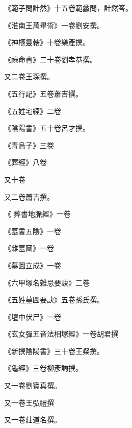 \begin{pinyinscope}
 《範子問計然》十五卷範蠡問，計然答。



 《淮南王萬畢術》一卷劉安撰。



 《神樞靈轄》十卷樂產撰。



 《祿命書》二十卷劉孝恭撰。



 又二卷王琛撰。



 《五行記》五卷蕭吉撰。



 《五姓宅經》二卷



 《陰陽書》五十卷呂才撰。



 《青烏子》三卷



 《葬經》八卷



 又十卷



 又二卷蕭吉撰。



 《
 葬書地脈經》一卷



 《墓書五陰》一卷



 《雜墓圖》一卷



 《墓圖立成》一卷



 《六甲塚名雜忌要訣》二卷



 《五姓墓圖要訣》五卷孫氏撰。



 《壇中伏尸》一卷



 《玄女彈五音法相塚經》一卷胡君撰



 《新撰陰陽書》三十卷王粲撰。



 《龜經》三卷柳彥詢撰。



 又一卷劉寶真撰。



 又一卷王弘禮撰



 又一卷莊道名撰。




\end{pinyinscope}

